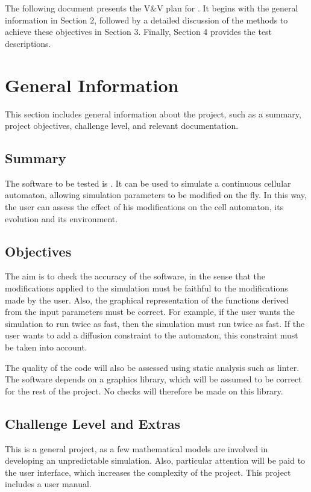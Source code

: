\documentclass[12pt, titlepage]{article}
\begin{document}
The following document presents the V\&V plan for \progname. It begins with the general information in Section 2, followed by a detailed discussion of the methods to achieve these objectives in Section 3. Finally, Section 4 provides the test descriptions.

\section{General Information}

This section includes general information about the project, such as a summary, project objectives, challenge level, and relevant documentation.

\subsection{Summary}

The software to be tested is \progname. It can be used to simulate a continuous cellular automaton, allowing simulation parameters to be modified on the fly. 
In this way, the user can assess the effect of his modifications on the cell automaton, its evolution and its environment.

\subsection{Objectives}

The aim is to check the accuracy of the software, in the sense that the modifications applied to the simulation must be faithful to the modifications made by the user. 
Also, the graphical representation of the functions derived from the input parameters must be correct. 
For example, if the user wants the simulation to run twice as fast, then the simulation must run twice as fast.
If the user wants to add a diffusion constraint to the automaton, this constraint must be taken into account.

The quality of the code will also be assessed using static analysis such as linter.
The software depends on a graphics library, which will be assumed to be correct for the rest of the project. No checks will therefore be made on this library.

\subsection{Challenge Level and Extras}

This is a general project, as a few mathematical models are involved in developing an unpredictable simulation.
Also, particular attention will be paid to the user interface, which increases the complexity of the project.
This project includes a user manual.
\end{document}
